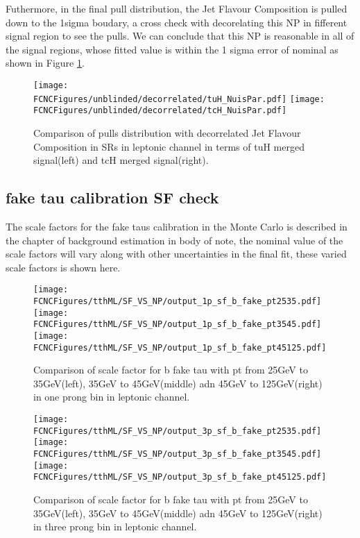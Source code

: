 Futhermore, in the final pull distribution, the Jet Flavour Composition is pulled down to the 1sigma boudary, a cross check with decorelating this NP in fifferent signal region to see the pulls. We can conclude that this NP is reasonable in all of the signal regions, whose fitted value is within the 1 sigma error of nominal as shown in Figure \ref{fig:decorrelated_JFC}.
\begin{figure}[H]
\centering
\texttt{[image: \\FCNCFigures/unblinded/decorrelated/tuH\_NuisPar.pdf]}
\texttt{[image: \\FCNCFigures/unblinded/decorrelated/tcH\_NuisPar.pdf]}
\\
\caption{Comparison of pulls distribution with decorrelated Jet Flavour Composition in SRs in leptonic channel in terms of tuH merged signal(left) and tcH merged signal(right).}
\label{fig:decorrelated_JFC}
\end{figure}



\subsection{fake tau calibration SF check}
The scale factors for the fake taus calibration in the Monte Carlo is described in the chapter of background estimation in body of note, the nominal value of the scale factors will vary along with other uncertainties in the final fit, these varied scale factors is shown here.

\begin{figure}[H]
\centering
\texttt{[image: \\FCNCFigures/tthML/SF\_VS\_NP/output\_1p\_sf\_b\_fake\_pt2535.pdf]}
\texttt{[image: \\FCNCFigures/tthML/SF\_VS\_NP/output\_1p\_sf\_b\_fake\_pt3545.pdf]}
\texttt{[image: \\FCNCFigures/tthML/SF\_VS\_NP/output\_1p\_sf\_b\_fake\_pt45125.pdf]}
\\
\caption{Comparison of scale factor for b fake tau with pt from 25GeV to 35GeV(left), 35GeV to 45GeV(middle) adn 45GeV to 125GeV(right) in one prong bin in leptonic channel.}
\label{fig:1p_sf_b_fake_pt2535}
\end{figure}

\begin{figure}[H]
\centering
\texttt{[image: \\FCNCFigures/tthML/SF\_VS\_NP/output\_3p\_sf\_b\_fake\_pt2535.pdf]}
\texttt{[image: \\FCNCFigures/tthML/SF\_VS\_NP/output\_3p\_sf\_b\_fake\_pt3545.pdf]}
\texttt{[image: \\FCNCFigures/tthML/SF\_VS\_NP/output\_3p\_sf\_b\_fake\_pt45125.pdf]}
\\
\caption{Comparison of scale factor for b fake tau with pt from 25GeV to 35GeV(left), 35GeV to 45GeV(middle) adn 45GeV to 125GeV(right) in three prong bin in leptonic channel.}
\label{fig:3p_sf_b_fake_pt2535}
\end{figure}
	





